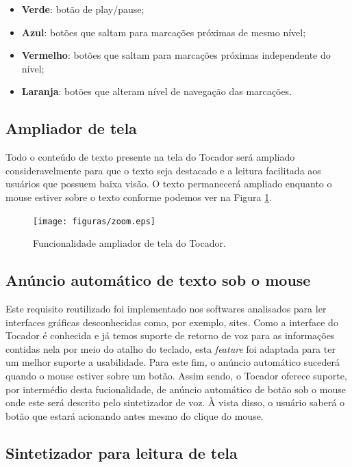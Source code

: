 \begin{itemize}
	\item{\textbf{Verde}:} botão de play/pause;
	\item{\textbf{Azul}:} botões que saltam para marcações próximas de mesmo nível;
	\item{\textbf{Vermelho}:} botões que saltam para marcações próximas independente do nível;
	\item{\textbf{Laranja}:} botões que alteram nível de navegação das marcações.
\end{itemize}

\subsection{Ampliador de tela}

Todo o conteúdo de texto presente na tela do Tocador será ampliado consideravelmente para que o texto seja destacado e a leitura facilitada aos usuários que possuem baixa visão. O texto permanecerá ampliado enquanto o mouse estiver sobre o texto conforme podemos ver na Figura \ref{zoom}.

 \begin{figure}[ht]
	\centering
		\texttt{[image: figuras/zoom.eps]}
	\caption{Funcionalidade ampliador de tela do Tocador.}
	\label{zoom}
\end{figure}

\subsection{Anúncio automático de texto sob o mouse}

Este requisito reutilizado foi implementado nos softwares analisados para ler interfaces gráficas desconhecidas como, por exemplo, sites. Como a interface do Tocador é conhecida e já temos suporte de retorno de voz para as informações contidas nela por meio do atalho do teclado, esta \textit{feature} foi adaptada para ter um melhor suporte a usabilidade. Para este fim, o anúncio automático sucederá quando o mouse estiver sobre um botão. Assim sendo, o Tocador oferece suporte, por intermédio desta fucionalidade, de anúncio automático de botão sob o mouse onde este será descrito pelo sintetizador de voz. À vista disso, o usuário saberá o botão que estará acionando antes mesmo do clique do mouse.

\subsection{Sintetizador para leitura de tela}

